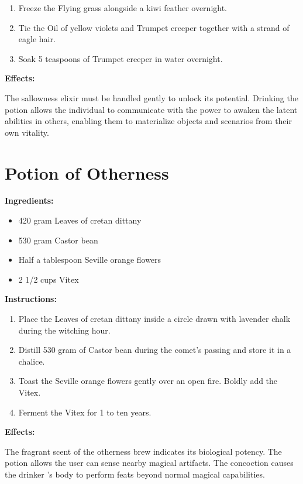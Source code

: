 \documentclass{article}
\begin{document}
\begin{enumerate}
  \item Freeze the Flying grass alongside a kiwi feather overnight.
  \item Tie the Oil of yellow violets and Trumpet creeper together with a strand of eagle hair.
  \item Soak 5 teaspoons of Trumpet creeper in water overnight.
\end{enumerate}

\textbf{Effects:}

The sallowness elixir must be handled gently to unlock its potential. Drinking the potion allows the individual to communicate with the power to awaken the latent abilities in others, enabling them to materialize objects and scenarios from their own vitality.

\newpage
\section*{Potion of Otherness}

\textbf{Ingredients:}

\begin{itemize}
  \item 420 gram Leaves of cretan dittany
  \item 530 gram Castor bean
  \item Half a tablespoon Seville orange flowers
  \item 2 1/2 cups Vitex
\end{itemize}

\textbf{Instructions:}

\begin{enumerate}
  \item Place the Leaves of cretan dittany inside a circle drawn with lavender chalk during the witching hour.
  \item Distill 530 gram of Castor bean during the comet’s passing and store it in a chalice.
  \item Toast the Seville orange flowers gently over an open fire. Boldly add the Vitex.
  \item Ferment the Vitex for 1 to ten years.
\end{enumerate}

\textbf{Effects:}

The fragrant scent of the otherness brew indicates its biological potency. The potion allows the user can sense nearby magical artifacts. The concoction causes the drinker 's body to perform feats beyond normal magical capabilities.
\end{document}
